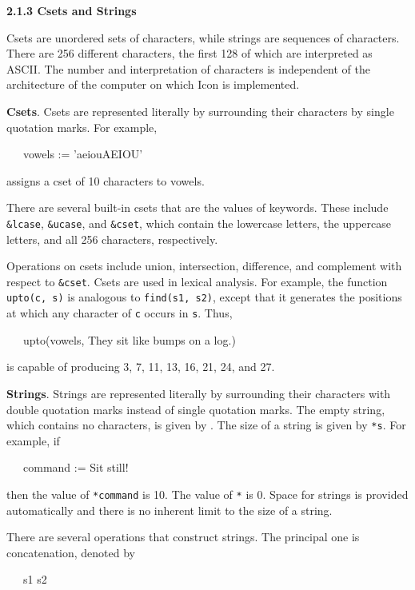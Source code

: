 {\sffamily\bfseries
2.1.3 Csets and Strings}


Csets are unordered sets of characters, while strings are sequences of
characters. There are 256 different characters, the first 128 of which
are interpreted as ASCII. The number and interpretation of characters
is independent of the architecture of the computer on which Icon is
implemented.


\textbf{Csets}. Csets are represented literally by surrounding their
characters by single quotation marks. For example,

{\ttfamily\mdseries
\ \ \ vowels := 'aeiouAEIOU'}

\noindent assigns a cset of 10 characters to vowels.

There are several built-in csets that are the values of
keywords. These include \texttt{\&lcase}, \texttt{\&ucase}, and
\texttt{\&cset}, which contain the lowercase letters, the uppercase
letters, and all 256 characters, respectively.

Operations on csets include union, intersection, difference, and
complement with respect to \texttt{\&cset}. Csets are used in lexical
analysis. For example, the function \texttt{upto(c, s)} is analogous
to \texttt{find(s1, s2)}, except that it generates the positions at
which any character of \texttt{c} occurs in \texttt{s}. Thus,

{\ttfamily\mdseries
\ \ \ upto(vowels, {\textquotedbl}They sit like bumps on a log.{\textquotedbl})}


\noindent is capable of producing 3, 7, 11, 13, 16, 21, 24, and 27.


\textbf{Strings}. Strings are represented literally by surrounding
their characters with double quotation marks instead of single
quotation marks. The empty string, which contains no characters, is
given by \texttt{{\textquotedbl}{\textquotedbl}}. The size of a string
is given by \texttt{*s}. For example, if

{\ttfamily\mdseries
\ \ \ command := {\textquotedbl}Sit still!{\textquotedbl}}

\noindent then the value of \texttt{*command} is 10. The value of
\texttt{*{\textquotedbl}{\textquotedbl}} is 0. Space for strings is
provided automatically and there is no inherent limit to the size of a
string.

There are several operations that construct strings. The principal one
is concatenation, denoted by

{\ttfamily\mdseries
\ \ \ s1 {\textbar}{\textbar} s2}

